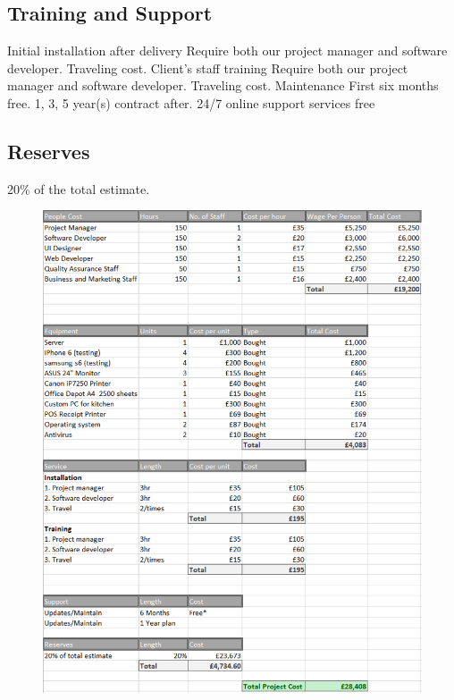 \documentclass[11pt, a4paper]{report}
\begin{document}
\subsection{Training and Support} 
Initial installation after delivery
Require both our project manager and software developer.
Traveling cost.
Client’s staff training
Require both our project manager and software developer.
Traveling cost.
Maintenance
First six months free.
1, 3, 5 year(s) contract after.
24/7 online support services free
\subsection{Reserves} 
20\% of the total estimate.
\pagebreak 
\begin{figure}
\centering
\includegraphics[scale=0.9]{Figures/Costing.png}
\end{figure}
\pagebreak 
\end{document}

